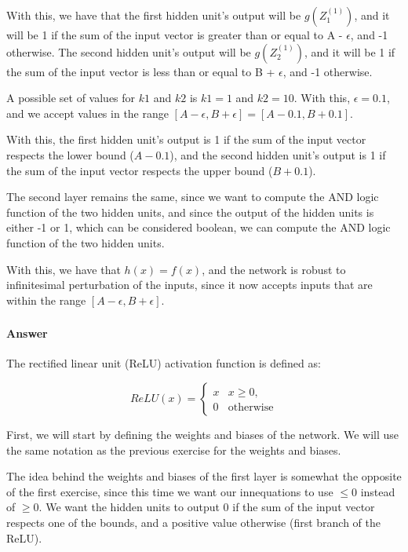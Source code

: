 \documentclass{article}
\begin{document}
\bigskip

With this, we have that the first hidden unit's output will be $g(Z^{(1)}_1)$, and it will be 1 if the sum of the 
input vector is greater than or equal to A - $\epsilon$, and -1 otherwise. The second hidden unit's output will be $g(Z^{(1)}_2)$,
and it will be 1 if the sum of the input vector is less than or equal to B + $\epsilon$, and -1 otherwise.

A possible set of values for $k1$ and $k2$ is $k1 = 1$ and $k2 = 10$. With this, $\epsilon = 0.1$, and we accept values in
the range $[A - \epsilon, B + \epsilon] = [A - 0.1, B + 0.1]$.

With this, the first hidden unit's output is 1 if the sum of the input vector respects the lower bound ($A - 0.1$),
and the second hidden unit's output is 1 if the sum of the input vector respects the upper bound ($B + 0.1$).

The second layer remains the same, since we want to compute the AND logic function of the two hidden units, and since the output of
the hidden units is either -1 or 1, which can be considered boolean, we can compute the AND logic function of the two hidden units.

\bigskip

With this, we have that \(h(x) = f(x)\), and the network is robust to infinitesimal perturbation of the inputs, since it now accepts inputs
that are within the range \([A - \epsilon, B + \epsilon]\).

\subsubsection{}

\paragraph{Answer}

The rectified linear unit (ReLU) activation function is defined as:

\[ 
    ReLU(x) = 
    \begin{cases}
        x & x \geq 0, \\
        0 & \text{otherwise}
    \end{cases}
\]

First, we will start by defining the weights and biases of the network. We will use the same notation as the previous 
exercise for the weights and biases.

\bigskip

The idea behind the weights and biases of the first layer is somewhat the opposite of the first exercise, since this time we want our innequations
to use $\leq 0$ instead of $\geq 0$. We want the hidden units to output 0 if the sum of the input vector respects one of the bounds, 
and a positive value otherwise (first branch of the ReLU).
\end{document}
